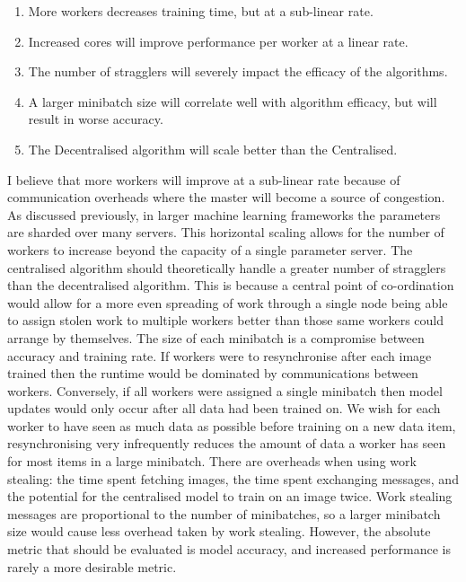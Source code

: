\documentclass[12pt]{article}
\begin{document}
\begin{enumerate}
\item More workers decreases training time, but at a sub-linear rate.
\item Increased cores will improve performance per worker at a linear rate.
\item The number of stragglers will severely impact the efficacy of the algorithms.
\item A larger minibatch size will correlate well with algorithm efficacy, but will result in worse accuracy.
\item The Decentralised algorithm will scale better than the Centralised.
\end{enumerate}

I believe that more workers will improve at a sub-linear rate because of communication overheads where the master will become a source of congestion. As discussed previously, in larger machine learning frameworks the parameters are sharded over many servers. This horizontal scaling allows for the number of workers to increase beyond the capacity of a single parameter server.
\newline
\newline
The centralised algorithm should theoretically handle a greater number of stragglers than the decentralised algorithm. This is because a central point of co-ordination would allow for a more even spreading of work through a single node being able to assign stolen work to multiple workers better than those same workers could arrange by themselves.
\newline
\newline
The size of each minibatch is a compromise between accuracy and training rate. If workers were to resynchronise after each image trained then the runtime would be dominated by communications between workers. Conversely, if all workers were assigned a single minibatch then model updates would only occur after all data had been trained on. We wish for each worker to have seen as much data as possible before training on a new data item, resynchronising very infrequently reduces the amount of data a worker has seen for most items in a large minibatch.
There are overheads when using work stealing: the time spent fetching images, the time spent exchanging messages, and the potential for the centralised model to train on an image twice. Work stealing messages are proportional to the number of minibatches, so a larger minibatch size would cause less overhead taken by work stealing.
However, the absolute metric that should be evaluated is model accuracy, and increased performance is rarely a more desirable metric.
\end{document}

